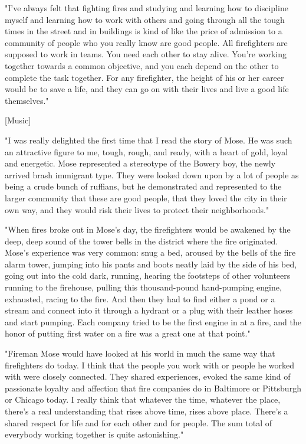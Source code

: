 "I've always felt that fighting fires and studying and learning how to discipline myself and learning how to work with others and going through all the tough times in the street and in buildings is kind of like the price of admission to a community of people who you really know are good people. All firefighters are supposed to work in teams. You need each other to stay alive. You're working together towards a common objective, and you each depend on the other to complete the task together. For any firefighter, the height of his or her career would be to save a life, and they can go on with their lives and live a good life themselves."

[Music]

"I was really delighted the first time that I read the story of Mose. He was such an attractive figure to me, tough, rough, and ready, with a heart of gold, loyal and energetic. Mose represented a stereotype of the Bowery boy, the newly arrived brash immigrant type. They were looked down upon by a lot of people as being a crude bunch of ruffians, but he demonstrated and represented to the larger community that these are good people, that they loved the city in their own way, and they would risk their lives to protect their neighborhoods."

"When fires broke out in Mose's day, the firefighters would be awakened by the deep, deep sound of the tower bells in the district where the fire originated. Mose's experience was very common: snug a bed, aroused by the bells of the fire alarm tower, jumping into his pants and boots neatly laid by the side of his bed, going out into the cold dark, running, hearing the footsteps of other volunteers running to the firehouse, pulling this thousand-pound hand-pumping engine, exhausted, racing to the fire. And then they had to find either a pond or a stream and connect into it through a hydrant or a plug with their leather hoses and start pumping. Each company tried to be the first engine in at a fire, and the honor of putting first water on a fire was a great one at that point."

"Fireman Mose would have looked at his world in much the same way that firefighters do today. I think that the people you work with or people he worked with were closely connected. They shared experiences, evoked the same kind of passionate loyalty and affection that fire companies do in Baltimore or Pittsburgh or Chicago today. I really think that whatever the time, whatever the place, there's a real understanding that rises above time, rises above place. There's a shared respect for life and for each other and for people. The sum total of everybody working together is quite astonishing."

